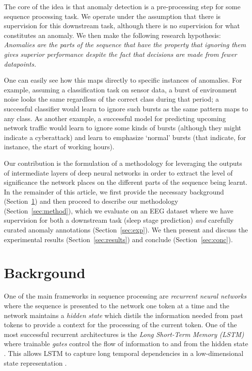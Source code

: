 \documentclass[conference]{IEEEtran}
\begin{document}
The core of the idea is that anomaly detection is a pre-processing
step for some sequence processing task. We operate under the
assumption that there is supervision for this downstream task,
although there is no supervision for what constitutes an anomaly.
We then make the following research hypothesis:
\emph{Anomalies are the parts of the sequence that have the property
that ignoring them gives superior performance despite the fact that
decisions are made from fewer datapoints.}

One can easily see how this maps directly to specific instances of
anomalies. For example, assuming a classification task on sensor data,
a burst of environment noise looks the same regardless of the correct
class during that period; a successful classifier would learn to
ignore such bursts as the same pattern maps to any class. As another
example, a successful model for predicting upcoming network traffic
would learn to ignore some kinds of bursts (although they might
indicate a cyberattack) and learn to emphasize `normal' bursts
(that indicate, for instance, the start of working hours).

Our contribution is the formulation of a methodology for leveraging
the outputs of intermediate layers of deep neural networks in order
to extract the level of significance the network places on the
different parts of the sequence being learnt. In the remainder of
this article, we first provide the necessary background
(Section~\ref{sec:bg}) and then proceed to describe our
methodology (Section~\ref{sec:method}), which we evaluate on
an EEG dataset where we have supervision for both a downstream task
(sleep stage prediction) \emph{and} carefully curated anomaly
annotations (Section~\ref{sec:exp}). We then present and discuss
the experimental results (Section~\ref{sec:results}) and conclude
(Section~\ref{sec:conc}).



\section{Backrgound}
\label{sec:bg}


One of the main frameworks in sequence processing are
\emph{recurrent neural networks} where the sequence is presented to
the network one token at a time and the network maintains a
\emph{hidden state} which distils the information needed from past
tokens to provide a context for the processing of the current token.
One of the most successful recurrent architectures is the
\emph{Long Short-Term Memory (LSTM)} where trainable \emph{gates}
control the flow of information to and from the hidden state
\cite{hochreiter-schmidhuber:1997}. This allows LSTM to capture long
temporal dependencies in a low-dimensional state representation
\cite{HOJJATI2024106106,10744017}.
\end{document}
